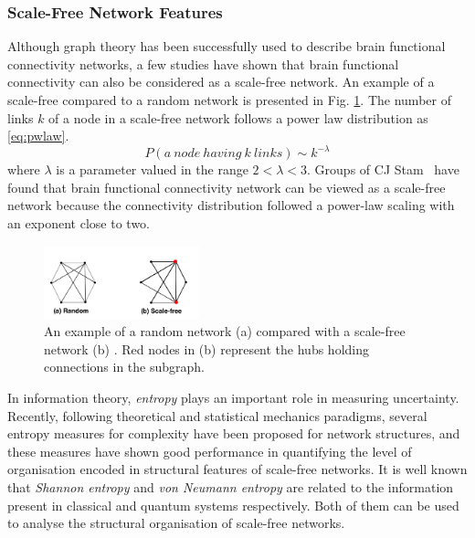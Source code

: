 \subsubsection{Scale-Free Network Features}
Although graph theory has been successfully used to describe brain functional connectivity networks, a few studies have shown that brain functional connectivity can also be considered as a scale-free network. An example of a scale-free compared to a random network is presented in Fig. \ref{fig:scalefree}. The number of links $k$ of a node in a scale-free network follows a power law distribution as \eqref{eq:pwlaw}.
\begin{equation} \label{eq:pwlaw}
P(a \ node \ having \ k \ links ) \sim k^{-\lambda}
\end{equation}
where $\lambda$ is a parameter valued in the range $2<\lambda<3$.
Groups of CJ Stam~\cite{stam2004functional} have found that brain functional connectivity network can be viewed as a scale-free network because the connectivity distribution followed a power-law scaling with an exponent close to two.

\begin{figure}[!t]
    \centering
    \includegraphics[width=0.4\textwidth]{./images/Scale-free.png}
    \caption{An example of a random network (a) compared with a scale-free network (b) . Red nodes in (b) represent the hubs holding connections in the subgraph.}
    \label{fig:scalefree}
\end{figure}

In information theory, \emph{entropy} plays an important role in measuring uncertainty. Recently, following theoretical and statistical mechanics paradigms, several entropy measures for complexity have been proposed for network structures, and these measures have shown good performance in quantifying the level of organisation encoded in structural features of scale-free networks. It is well known that \emph{Shannon entropy} and \emph{von Neumann entropy} are related to the information present in classical and quantum systems respectively. Both of them can be used to analyse the structural organisation of scale-free networks\cite{anand2009entropy}. 

